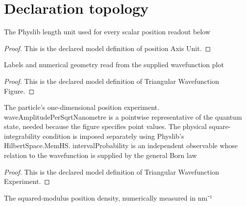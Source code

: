 \section{Declaration topology}
\begin{definition}
  \label{def:physics:phyx-mini-0651:phyxminiproblems-problemphyxmini0651-positionaxisunit}
  The Physlib length unit used for every scalar position readout below
\end{definition}
\begin{proof}
  This is the declared model definition of position Axis Unit.
\end{proof}
\begin{definition}
  \label{def:physics:phyx-mini-0651:phyxminiproblems-problemphyxmini0651-triangularwavefunctionfigure}
  Labels and numerical geometry read from the supplied wavefunction plot
\end{definition}
\begin{proof}
  This is the declared model definition of Triangular Wavefunction Figure.
\end{proof}
\begin{definition}
  \label{def:physics:phyx-mini-0651:phyxminiproblems-problemphyxmini0651-triangularwavefunctionexperiment}
  The particle's one-dimensional position experiment. waveAmplitudePerSqrtNanometre is a pointwise representative of the quantum state, needed because the figure specifies point values. The physical square-integrability condition is imposed separately using Physlib's HilbertSpace.MemHS. intervalProbability is an independent observable whose relation to the wavefunction is supplied by the general Born law
\end{definition}
\begin{proof}
  This is the declared model definition of Triangular Wavefunction Experiment.
\end{proof}
\begin{definition}
  \label{def:physics:phyx-mini-0651:phyxminiproblems-problemphyxmini0651-probabilitydensitypernanometre}
  The squared-modulus position density, numerically measured in nm⁻¹
\end{definition}
